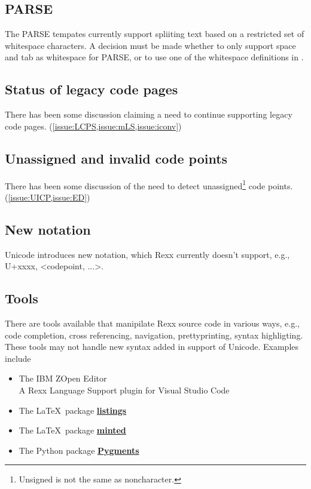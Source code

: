 \documentclass[b4paper]{article}
\begin{document}
\subsection{PARSE}
The PARSE tempates currently support spliiting text based on a
restricted set of whitespace characters.  A decision must be made
whether to only support space and tab as whitespace for PARSE, or to
use one of the whitespace definitions in \cite{UAX31}.

\subsection{Status of legacy code pages}
There has been some discussion claiming a need to continue supporting legacy code pages. (\cref{issue:LCPS,issue:mLS,issue:iconv})

\subsection{Unassigned and invalid code points}
There has been some discussion of the need to detect
unassigned\footnote{Unsigned is not the same as noncharacter.}
code points. (\cref{issue:UICP,issue:ED})

\subsection{New notation}
Unicode introduces new notation, which Rexx currently doesn't support, e.g., U+xxxx, <codepoint, ...>.

\subsection{Tools}
There are tools available that manipilate Rexx source code in various
ways, e.g., code completion, cross referencing, navigation, prettyprinting, syntax highligting.
These tools may not handle new syntax added in support of Unicode. Examples include
\begin{itemize}
\item The IBM Z\textregistered Open Editor \\
A Rexx Language Support plugin for Visual Studio Code
\item The \LaTeX\  package \href{https://www.ctan.org/pkg/listings}{\textbf{listings}}
\item The \LaTeX \ package \href{https://www.ctan.org/pkg/minted}{\textbf{minted}}
\item The Python package \href{https://pygments.org/}{\textbf{Pygments}}
\end{itemize}
\end{document}
